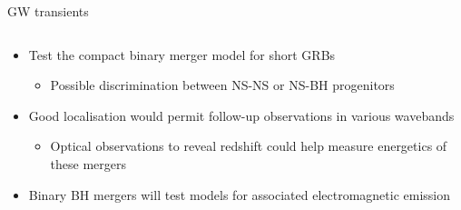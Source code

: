 \begin{frame}{GW transients}
  \begin{columns}[T]
    \begin{column}{0.6\textwidth}
      \begin{itemize}%
        \item Test the compact binary merger model for short GRBs
        \begin{itemize}
          \item [\to] Possible discrimination between NS-NS or NS-BH progenitors
        \end{itemize}
        \item Good localisation would permit follow-up observations in various wavebands
        \begin{itemize}
          \item [\to] Optical observations to reveal redshift could help measure energetics of these mergers
        \end{itemize}
        \item Binary BH mergers will test models for associated electromagnetic emission
      \end{itemize}
    \end{column}%
\end{columns}
\end{frame}
